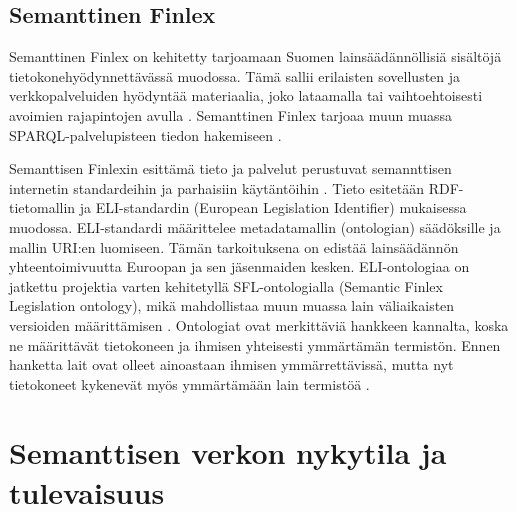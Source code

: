 \documentclass[finnish, 12pt, a4paper, elec, utf8, pdfa, online]{aaltothesis}
\begin{document}
{\subsection{Semanttinen Finlex}
Semanttinen Finlex on kehitetty tarjoamaan Suomen lainsäädännöllisiä sisältöjä tietokonehyödynnettävässä muodossa. Tämä sallii erilaisten sovellusten ja verkkopalveluiden hyödyntää materiaalia, joko lataamalla tai vaihtoehtoisesti avoimien rajapintojen avulla \cite{finlex}. Semanttinen Finlex tarjoaa muun muassa SPARQL-palvelupisteen tiedon hakemiseen \cite{finlex2}.

Semanttisen Finlexin esittämä tieto ja palvelut perustuvat semannttisen internetin standardeihin ja parhaisiin käytäntöihin \cite{finlex2}. Tieto esitetään RDF-tietomallin ja ELI-standardin (European Legislation Identifier) mukaisessa muodossa. ELI-standardi määrittelee metadatamallin (ontologian) säädöksille ja mallin URI:en luomiseen. Tämän tarkoituksena on edistää lainsäädännön yhteentoimivuutta Euroopan ja sen jäsenmaiden kesken. ELI-ontologiaa on jatkettu projektia varten kehitetyllä SFL-ontologialla (Semantic Finlex Legislation ontology), mikä mahdollistaa muun muassa lain väliaikaisten versioiden määrittämisen \cite{finlex3}. Ontologiat ovat merkittäviä hankkeen kannalta, koska ne määrittävät tietokoneen ja ihmisen yhteisesti ymmärtämän termistön. Ennen hanketta lait ovat olleet ainoastaan ihmisen ymmärrettävissä, mutta nyt tietokoneet kykenevät myös ymmärtämään lain termistöä \cite{finlex}.


\clearpage
\section{Semanttisen verkon nykytila ja tulevaisuus}




}
\end{document}
